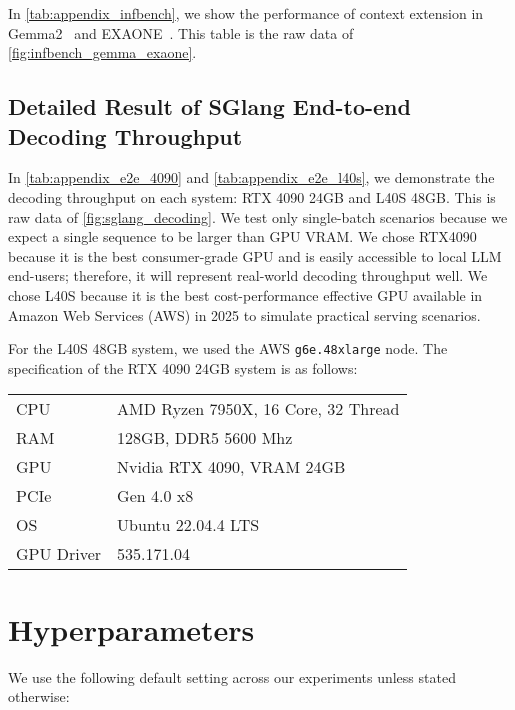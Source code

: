 

In \cref{tab:appendix_infbench}, we show the performance of \ours context extension in Gemma2~\citep{team_gemma_2024} and EXAONE~\citep{research_exaone3_2024}. This table is the raw data of \cref{fig:infbench_gemma_exaone}.

\subsection{Detailed Result of SGlang End-to-end Decoding Throughput}




In \cref{tab:appendix_e2e_4090} and \cref{tab:appendix_e2e_l40s}, we demonstrate the decoding throughput on each system: RTX 4090 24GB and L40S 48GB. This is raw data of \cref{fig:sglang_decoding}. We test only single-batch scenarios because we expect a single sequence to be larger than GPU VRAM. We chose RTX4090 because it is the best consumer-grade GPU and is easily accessible to local LLM end-users; therefore, it will represent real-world decoding throughput well. We chose L40S because it is the best cost-performance effective GPU available in Amazon Web Services (AWS) in 2025 to simulate practical serving scenarios. 

For the L40S 48GB system, we used the AWS \texttt{g6e.48xlarge} node. The specification of the RTX 4090 24GB system is as follows:

\hspace{1in}
\begin{tabular}{p{1in} p{3in}}
CPU & AMD Ryzen 7950X, 16 Core, 32 Thread\\
RAM & 128GB, DDR5 5600 Mhz\\
GPU & Nvidia RTX 4090, VRAM 24GB\\
PCIe & Gen 4.0 x8\\
OS & Ubuntu 22.04.4 LTS \\
GPU Driver & 535.171.04\\
\end{tabular}

\newpage
\section{Hyperparameters}
\label{sec:appendix_hyperparameter}

We use the following default setting across our experiments unless stated otherwise:

